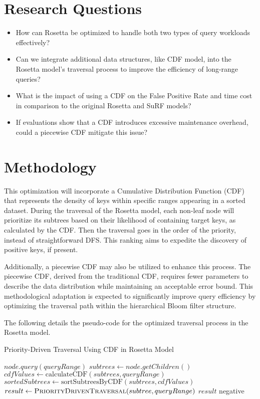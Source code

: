\documentclass[12pt, letterpaper]{article}
\begin{document}
\section{Research Questions}
\begin{itemize}
    \item How can Rosetta be optimized to handle both two types of query workloads effectively?
    \item Can we integrate additional data structures, like CDF model, into the Rosetta model's traversal process to improve the efficiency of long-range queries?
    \item What is the impact of using a CDF on the False Positive Rate and time cost in comparison to the original Rosetta and SuRF models?
    \item If evaluations show that a CDF introduces excessive maintenance overhead, could a piecewise CDF mitigate this issue?
\end{itemize}


\section{Methodology}
This optimization will incorporate a Cumulative Distribution Function (CDF) that represents the density of keys within specific ranges appearing in a sorted dataset. During the traversal of the Rosetta model, each non-leaf node will prioritize its subtrees based on their likelihood of containing target keys, as calculated by the CDF. Then the traversal goes in the order of the priority, instead of straightforward DFS. This ranking aims to expedite the discovery of positive keys, if present.  

Additionally, a piecewise CDF may also be utilized to enhance this process. The piecewise CDF, derived from the traditional CDF, requires fewer parameters to describe the data distribution while maintaining an acceptable error bound. This methodological adaptation is expected to significantly improve query efficiency by optimizing the traversal path within the hierarchical Bloom filter structure.  

The following details the pseudo-code for the optimized traversal process in the Rosetta model.

\begin{algorithm}
\caption{Priority-Driven Traversal Using CDF in Rosetta Model}
\begin{algorithmic}[1]
        \State \Return $node.query(queryRange)$
    \Else
        \State $subtrees \gets node.getChildren()$
        \State $cdfValues \gets \text{calculateCDF}(subtrees, queryRange)$
        \State $sortedSubtrees \gets \text{sortSubtreesByCDF}(subtrees, cdfValues)$
            \State $result \gets \Call{PriorityDrivenTraversal}{subtree, queryRange}$
                \State \Return $result$
            \EndIf
        \EndFor
        \State \Return negative
    \EndIf
\EndProcedure
\end{algorithmic}
\end{algorithm}
\end{document}
